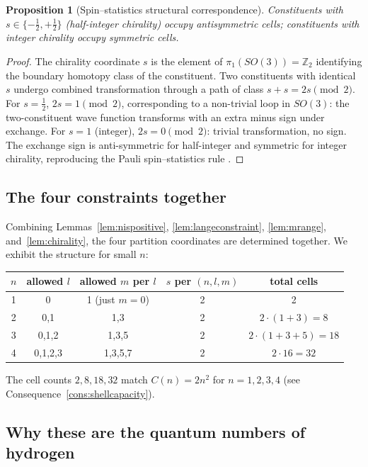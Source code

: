 \documentclass[11pt,twocolumn,a4paper]{article}
\theoremstyle{axiomstyle}
\theoremstyle{conseqstyle}
\newtheorem{proposition}{Proposition}
\theoremstyle{definition}
\theoremstyle{remark}
\newcommand{\Integer}{\mathbb{Z}}
\begin{document}
\begin{proposition}[Spin--statistics structural correspondence]
\label{prop:spinstatistics}
Constituents with $s\in\{-\tfrac{1}{2},+\tfrac{1}{2}\}$ (half-integer chirality) occupy antisymmetric cells; constituents with integer chirality occupy symmetric cells.
\end{proposition}

\begin{proof}
The chirality coordinate $s$ is the element of $\pi_{1}(SO(3))=\Integer_{2}$ identifying the boundary homotopy class of the constituent. Two constituents with identical $s$ undergo combined transformation through a path of class $s+s=2s\pmod 2$. For $s=\tfrac{1}{2}$, $2s=1\pmod 2$, corresponding to a non-trivial loop in $SO(3)$: the two-constituent wave function transforms with an extra minus sign under exchange. For $s=1$ (integer), $2s=0\pmod 2$: trivial transformation, no sign. The exchange sign is anti-symmetric for half-integer and symmetric for integer chirality, reproducing the Pauli spin--statistics rule \citep{pauli1925}.
\end{proof}

\subsection{The four constraints together}

Combining Lemmas~\ref{lem:nispositive}, \ref{lem:langeconstraint}, \ref{lem:mrange}, and~\ref{lem:chirality}, the four partition coordinates are determined together. We exhibit the structure for small $n$:
\begin{center}
\begin{tabular}{c|c|c|c|c}
\toprule
$n$ & allowed $l$ & allowed $m$ per $l$ & $s$ per $(n,l,m)$ & total cells\\
\midrule
1 & 0 & 1 (just $m=0$) & 2 & 2\\
2 & 0,1 & 1,3 & 2 & $2\cdot(1+3)=8$\\
3 & 0,1,2 & 1,3,5 & 2 & $2\cdot(1+3+5)=18$\\
4 & 0,1,2,3 & 1,3,5,7 & 2 & $2\cdot 16=32$\\
\bottomrule
\end{tabular}
\end{center}
The cell counts $2, 8, 18, 32$ match $C(n)=2n^{2}$ for $n=1,2,3,4$ (see Consequence~\ref{cons:shellcapacity}).

\subsection{Why these are the quantum numbers of hydrogen}
\end{document}

